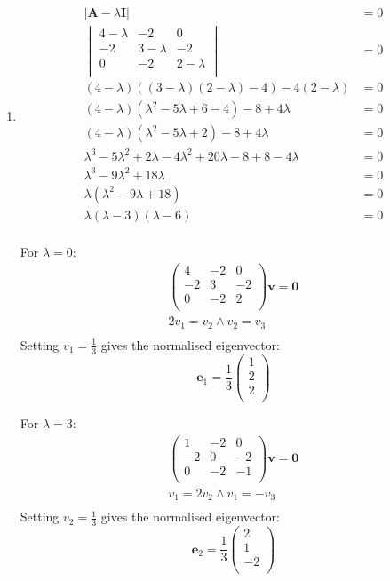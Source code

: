 \documentclass[10pt,oneside,a4paper]{article}
\begin{document}
\begin{enumerate}
\begin{enumerate}[label=(\roman*)]
\end{enumerate}

\item

\[
\begin{split}
|\mathbf{A} - \lambda\mathbf{I}| &= 0 \\
\begin{vmatrix}
4 - \lambda & -2 & 0 \\
-2 & 3 - \lambda & -2 \\
0 & -2 & 2 - \lambda \\
\end{vmatrix} &= 0 \\
(4 - \lambda)((3 - \lambda)(2 - \lambda) - 4) - 4(2 - \lambda) &= 0 \\
(4 - \lambda)(\lambda^2 - 5 \lambda + 6 - 4) - 8 + 4\lambda &= 0 \\
(4 - \lambda)(\lambda^2 - 5\lambda + 2) - 8 + 4\lambda &= 0 \\
\lambda^3 - 5\lambda^2 + 2\lambda - 4\lambda^2 + 20\lambda - 8 + 8 - 4\lambda &= 0 \\
\lambda^3 - 9\lambda^2 + 18\lambda &= 0 \\
\lambda(\lambda^2 - 9\lambda + 18) &= 0 \\
\lambda(\lambda - 3)(\lambda - 6) &= 0 \\
\end{split}
\]

For $\lambda = 0$:
\begin{gather*}
\begin{pmatrix}
4 & -2 & 0 \\
-2 & 3 & -2 \\
0 & -2 & 2 \\
\end{pmatrix}
\mathbf{v}
=
\mathbf{0} \\
2v_1 = v_2 \wedge v_2 = v_3 \\
\end{gather*}
Setting $v_1 = \frac{1}{3}$ gives the normalised eigenvector:
\[
\mathbf{e}_1 = \frac{1}{3}\begin{pmatrix}
1 \\ 2 \\ 2 \\
\end{pmatrix}
\]

For $\lambda = 3$:
\begin{gather*}
\begin{pmatrix}
1 & -2 & 0 \\
-2 & 0 & -2 \\
0 & -2 & -1 \\
\end{pmatrix}
\mathbf{v} = \mathbf{0} \\
v_1 = 2v_2 \wedge v_1 = -v_3 \\
\end{gather*}
Setting $v_2 = \frac{1}{3} $ gives the normalised eigenvector:
\[
\mathbf{e}_2 = \frac{1}{3}\begin{pmatrix}
2 \\ 1 \\ -2 \\
\end{pmatrix}
\]


\end{enumerate}
\end{document}
